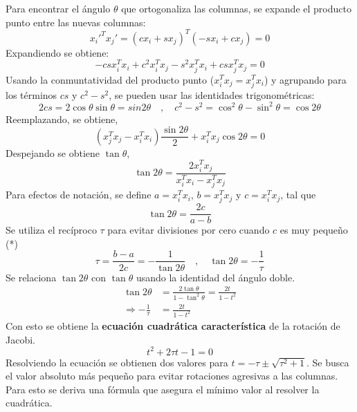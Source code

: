 \documentclass[a4paper]{article}
\begin{document}
Para encontrar el ángulo $\theta$ que ortogonaliza las columnas, se expande el producto punto entre las nuevas columnas:
\begin{equation}
    x_i'^Tx_j' = (cx_i + sx_j)^T(-sx_i + cx_j) = 0
\end{equation}
Expandiendo se obtiene:
\begin{equation}
    -csx_i^Tx_i + c^2 x_i^T x_j - s^2x_j^Tx_i + cs x_j^Tx_j = 0
\end{equation}
Usando la conmuntatividad del producto punto ($x_i^Tx_j = x_j^Tx_i$) y agrupando para los términos $cs$ y $c^2 - s^2$, se pueden usar
las identidades trigonométricas:
\begin{equation}
    2cs = 2\cos \theta \sin \theta = sin 2\theta \quad , \quad c^2 - s^2 = \cos^2 \theta - \sin^2 \theta = \cos 2\theta
\end{equation}
Reemplazando, se obtiene,
\begin{equation}
    (x^T_jx_j - x^T_ix_i) \frac{\sin 2\theta}{2} + x^T_ix_j \cos 2\theta = 0
\end{equation}
Despejando se obtiene $\tan \theta$,
\begin{equation}
    \tan 2\theta = \frac{2x_i^Tx_j}{x^T_ix_i - x_j^Tx_j}
\end{equation}
Para efectos de notación, se define $a = x_i^Tx_i$, $b = x_j^T x_j$ y $c = x_i^T x_j$, tal que
\begin{equation}
    \tan 2\theta = \frac{2c}{a - b}
\end{equation}
Se utiliza el recíproco $\tau$ para evitar divisiones por cero cuando $c$ es muy pequeño (*)
\begin{equation}
    \tau = \frac{b-a}{2c} = -\frac{1}{\tan 2\theta} \quad , \quad \tan 2\theta = -\frac{1}{\tau}
\end{equation}
Se relaciona $\tan 2\theta$ con $\tan \theta$ usando la identidad del ángulo doble.
\begin{align}
    \tan 2\theta &= \frac{2\tan \theta}{1 - \tan^2 \theta} = \frac{2t}{1-t^2}\\
    \Rightarrow -\frac{1}{\tau} &= \frac{2t}{1-t^2}
\end{align}
Con esto se obtiene la \textbf{ecuación cuadrática característica} de la rotación de Jacobi.
\begin{equation}
    t^2 + 2 \tau t -1 = 0
\end{equation}
Resolviendo la ecuación se obtienen dos valores para $t = -\tau \pm \sqrt{\tau^2 +1}$. Se busca el valor absoluto más pequeño para evitar rotaciones agresivas a las columnas. Para esto se deriva una fórmula que asegura el mínimo valor al resolver la cuadrática.
\end{document}
